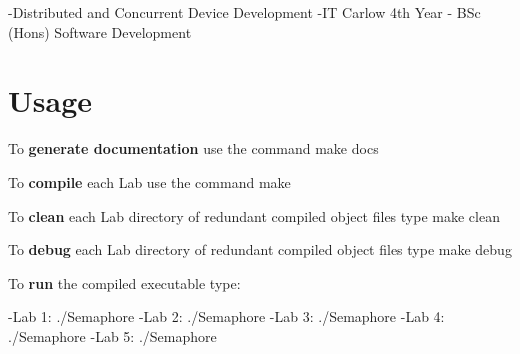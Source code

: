 -\/\+Distributed and Concurrent Device Development -\/\+IT Carlow 4th Year -\/ B\+Sc (Hons) Software Development

\section*{Usage}

To {\bfseries generate documentation} use the command make {\ttfamily docs}

To {\bfseries compile} each Lab use the command {\ttfamily make}

To {\bfseries clean} each Lab directory of redundant compiled object files type {\ttfamily make clean}

To {\bfseries debug} each Lab directory of redundant compiled object files type {\ttfamily make debug}

To {\bfseries run} the compiled executable type\+:

-\/\+Lab 1\+: {\ttfamily ./\+Semaphore} -\/\+Lab 2\+: {\ttfamily ./\+Semaphore} -\/\+Lab 3\+: {\ttfamily ./\+Semaphore} -\/\+Lab 4\+: {\ttfamily ./\+Semaphore} -\/\+Lab 5\+: {\ttfamily ./\+Semaphore} 